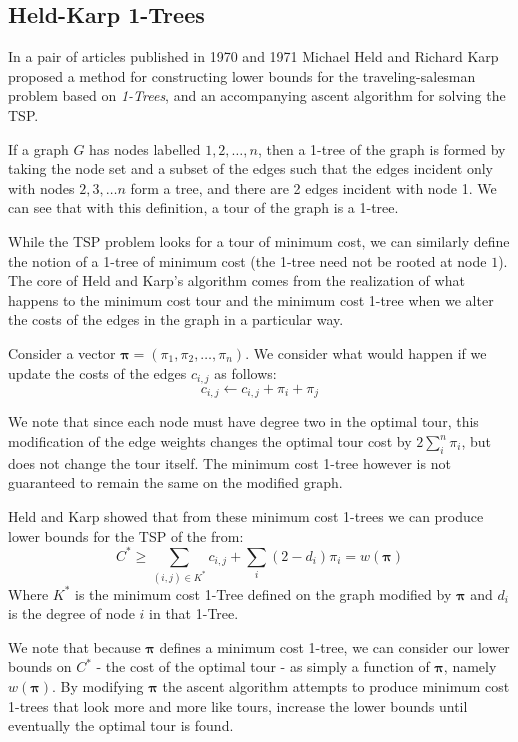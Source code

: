 \documentclass[11pt]{article}
\newcommand{\ve}[1]{\boldsymbol{#1}}
\begin{document}
\subsection{Held-Karp 1-Trees}

In a pair of articles published in 1970 and 1971 \cite{OneTree70,OneTree71} Michael Held and Richard Karp proposed a method for constructing lower bounds for the traveling-salesman problem based on \emph{1-Trees}, and an accompanying ascent algorithm for solving the TSP.

If a graph $G$ has nodes labelled $1, 2, \dots, n$, then a 1-tree of the graph is formed by taking the node set and a subset of the edges such that the edges incident only with nodes $2, 3, \dots n$ form a tree, and there are 2 edges incident with node 1. We can see that with this definition, a tour of the graph is  a 1-tree.

While the TSP problem looks for a tour of minimum cost, we can similarly define the notion of a 1-tree of minimum cost (the 1-tree need not be rooted at node $1$). The core of Held and Karp's algorithm comes from the realization of what happens to the minimum cost tour and the minimum cost 1-tree when we alter the costs of the edges in the graph in a particular way.

Consider a vector $\ve{\pi} = (\pi_1, \pi_2, \dots, \pi_n)$. We consider what would happen if we update the costs of the edges $c_{i,j}$ as follows:
$$ c_{i,j} \leftarrow c_{i,j} + \pi_i + \pi_j $$

We note that since each node must have degree two in the optimal tour, this modification of the edge weights changes the optimal tour cost by $2 \sum\limits_i^n \pi_i$, but does not change the tour itself. The minimum cost 1-tree however is not guaranteed to remain the same on the modified graph.

Held and Karp showed that from these minimum cost 1-trees we can produce lower bounds for the TSP of the from:
\[ C^* \geq \sum\limits_{(i,j) \in K^*} c_{i,j} + \sum\limits_i (2 - d_i)\pi_i = w(\ve{\pi}) \]
Where $K^*$ is the minimum cost 1-Tree defined on the graph modified by $\ve{\pi}$ and $d_i$ is the degree of node $i$ in that 1-Tree. 

We note that because $\ve{\pi}$ defines a minimum cost 1-tree, we can consider our lower bounds on $C^*$ - the cost of the optimal tour - as simply a function of $\ve{\pi}$, namely $w(\ve{\pi})$. By modifying $\ve{\pi}$ the ascent algorithm attempts to produce minimum cost 1-trees that look more and more like tours, increase the lower bounds until eventually the optimal tour is found.
\end{document}
